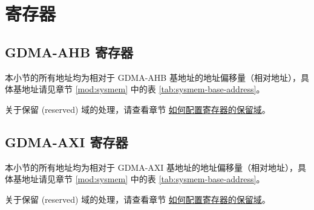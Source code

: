 \documentclass[main\_\_CN.tex]{subfiles}
\begin{document}


\newpage
\section{寄存器}

\subsection{GDMA-AHB 寄存器}

本小节的所有地址均为相对于 GDMA-AHB 基地址的地址偏移量（相对地址），具体基地址请见章节 \ref{mod:sysmem} \textit{} 中的表 \ref{tab:sysmem-base-address}。

关于保留 (reserved) 域的处理，请查看章节 \hyperref[programming-reserved-field]{如何配置寄存器的保留域}。



\subsection{GDMA-AXI 寄存器}

本小节的所有地址均为相对于 GDMA-AXI 基地址的地址偏移量（相对地址），具体基地址请见章节 \ref{mod:sysmem} \textit{} 中的表 \ref{tab:sysmem-base-address}。

关于保留 (reserved) 域的处理，请查看章节 \hyperref[programming-reserved-field]{如何配置寄存器的保留域}。


\end{document}

